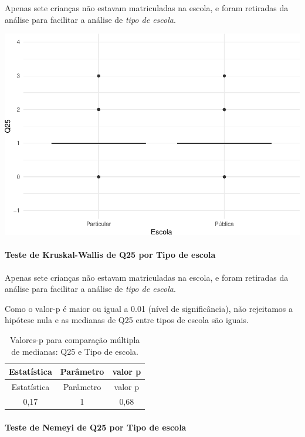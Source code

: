 \documentclass[]{article}
\let\oldparagraph\paragraph
\renewcommand{\paragraph}[1]{\oldparagraph{#1}\mbox{}}
\begin{document}
Apenas sete crianças não estavam matriculadas na escola, e foram retiradas da análise para facilitar a análise de \emph{tipo de escola}.

\begin{center}\includegraphics[width=0.75\linewidth]{relatorio_covid19_files/figure-latex/unnamed-chunk-707-1} \end{center}

\hypertarget{teste-de-kruskal-wallis-de-q25-por-tipo-de-escola}{%
\paragraph{Teste de Kruskal-Wallis de Q25 por Tipo de escola}\label{teste-de-kruskal-wallis-de-q25-por-tipo-de-escola}}

Apenas sete crianças não estavam matriculadas na escola, e foram retiradas da análise para facilitar a análise de \emph{tipo de escola}.

Como o valor-p é maior ou igual a 0.01 (nível de significância), não rejeitamos a hipótese nula e as medianas de Q25 entre tipos de escola são iguais.

\begin{longtable}[]{@{}ccc@{}}
\caption{\label{tab:unnamed-chunk-709}Valores-p para comparação múltipla de medianas: Q25 e Tipo de escola.}\tabularnewline
\toprule
Estatística & Parâmetro & valor p\tabularnewline
\midrule
\endfirsthead
\toprule
Estatística & Parâmetro & valor p\tabularnewline
\midrule
\endhead
0,17 & 1 & 0,68\tabularnewline
\bottomrule
\end{longtable}

\hypertarget{teste-de-nemeyi-de-q25-por-tipo-de-escola}{%
\paragraph{Teste de Nemeyi de Q25 por Tipo de escola}\label{teste-de-nemeyi-de-q25-por-tipo-de-escola}}
\end{document}
